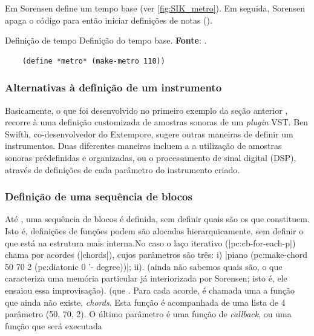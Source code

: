 Em  Sorensen define um tempo base (ver \autoref{fig:SIK_metro}). Em seguida, Sorensen apaga o código para então iniciar definições de notas ().

\begin{example}{Definição de tempo}
  \centering
Definição do tempo base. \textbf{Fonte}: \cite{sorensen_youtube_2014}.
  \begin{verbatim}
    (define *metro* (make-metro 110))
  \end{verbatim}
  \label{fig:SIK_metro}
\end{example}

\subsubsection*{Alternativas à definição de um instrumento}

Basicamente, o que foi desenvolvido no primeiro exemplo da seção anterior , recorre à uma definição customizada de amostras sonoras de um \emph{plugin} VST. Ben Swifth, co-desenvolvedor do Extempore, sugere outras maneiras de definir um instrumentos. Duas diferentes maneiras incluem a a utilização de amostras sonoras prédefinidas e organizadas, ou o processamento de sinal digital (DSP), através de definições de cada parâmetro do instrumento criado. 

\subsubsection*{Definição de uma sequência de blocos}

Até , uma sequência de blocos  é definida, sem definir quais são os  que constituem. Isto é, definições de funções podem são alocadas hierarquicamente, sem definir o que está na estrutura mais interna.No caso o laço iterativo (|pc:cb-for-each-p|) chama por acordes (|chords|), cujos parâmetros são três: i) |piano (pc:make-chord 50 70 2 (pc:diatonic 0 '- degree))|; ii). (ainda não sabemos quais são, o que caracteriza uma memória particular já interiorizada por Sorensen; isto é, ele ensaiou essa improvisação). (que  .  Para cada acorde, é chamada uma a função que ainda não existe, \emph{chords}. Esta função é acompanhada de uma lista de 4 parâmetro (50, 70, 2). O último parâmetro é uma função de \emph{callback}, ou uma função que será executada

